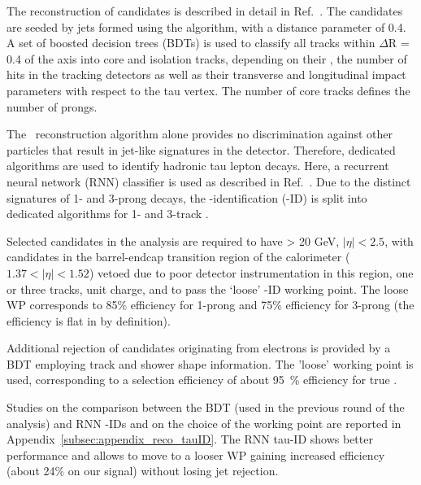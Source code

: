 The reconstruction of \tauhadvis candidates is described in detail in Ref.~\cite{Aad:2014rga}. The \tauhadvis candidates are
seeded by jets formed using the \antikt algorithm, with a distance parameter of 0.4. A set of boosted decision trees (BDTs) is used to classify all tracks within $\Delta$R = 0.4 of the \tauhadvis axis into core and isolation tracks, depending on their \pT, the number of hits in the tracking detectors as well as their transverse and longitudinal impact parameters with respect to the tau vertex. The number of core tracks defines the number of prongs.

The \tauhadvis\ reconstruction algorithm alone provides no discrimination against other particles that
result in jet-like signatures in the detector. Therefore, dedicated algorithms are used to identify hadronic tau lepton decays. Here, a recurrent neural network (RNN) classifier is used as described in Ref.~\cite{ATL-PHYS-PUB-2019-033}. Due to the distinct signatures of 1- and 3-prong \tauhad decays, the \tauhad-identification (\tauhad-ID) is split into dedicated algorithms for 1- and 3-track \tauhadvis.

Selected \tauhadvis candidates in the analysis are required to have \pT > 20 GeV, $|\eta| < 2.5$, with candidates in the barrel-endcap transition region of the calorimeter ($1.37 < |\eta| < 1.52$) vetoed due to poor detector instrumentation in this region, one or three tracks, unit charge, and to pass the ‘loose’ \tauhad-ID working point. The loose WP corresponds to 85\% efficiency for 1-prong and 75\% efficiency for 3-prong (the efficiency is flat in \pt by definition).

Additional rejection of \tauhadvis candidates originating from electrons is
provided by a BDT employing track and shower shape information. The 'loose'
working point is used, corresponding to a selection efficiency
of about \SI{95}{\percent} efficiency for true \tauhadvis.

Studies on the comparison between the BDT (used in the previous round of the analysis) and RNN \tauhad-IDs and on the choice of the working point are reported in Appendix~\ref{subsec:appendix_reco_tauID}. The RNN tau-ID shows better performance and allows to move to a looser WP gaining increased efficiency (about 24\% on our signal) without losing jet rejection.

